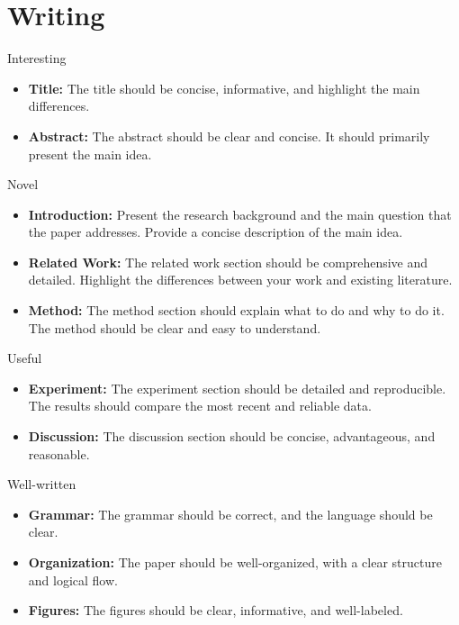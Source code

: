 \documentclass{beamer}
\begin{document}
\section{Writing}

\begin{frame}{Interesting}
    \begin{itemize}
        \item \textbf{Title:} The title should be concise, informative, and highlight the main differences.
        \item \textbf{Abstract:} The abstract should be clear and concise. It should primarily present the main idea.
    \end{itemize}
\end{frame}

\begin{frame}{Novel}
    \begin{itemize}
        \item \textbf{Introduction:} Present the research background and the main question that the paper addresses. Provide a concise description of the main idea.
        \item \textbf{Related Work:} The related work section should be comprehensive and detailed. Highlight the differences between your work and existing literature.
        \item \textbf{Method:} The method section should explain what to do and why to do it. The method should be clear and easy to understand.
    \end{itemize}
\end{frame}

\begin{frame}{Useful}
    \begin{itemize}
        \item \textbf{Experiment:} The experiment section should be detailed and reproducible. The results should compare the most recent and reliable data.
        \item \textbf{Discussion:} The discussion section should be concise, advantageous, and reasonable.
    \end{itemize}
\end{frame}

\begin{frame}{Well-written}
    \begin{itemize}
        \item \textbf{Grammar:} The grammar should be correct, and the language should be clear.
        \item \textbf{Organization:} The paper should be well-organized, with a clear structure and logical flow.
        \item \textbf{Figures:} The figures should be clear, informative, and well-labeled.
    \end{itemize}
\end{frame}
\end{document}

